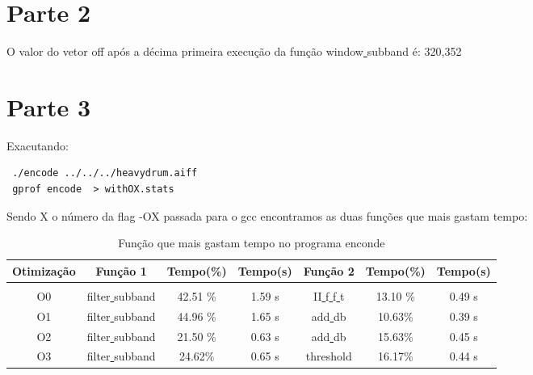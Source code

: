 \documentclass[10pt,a4paper]{article}
\begin{document}








\section{Parte 2}
O valor do vetor off após a décima primeira execução da função
window\underline{ }subband é: {320,352} 

\section{Parte 3}
Exacutando:
\begin{verbatim}
 ./encode ../../../heavydrum.aiff 
 gprof encode  > withOX.stats
\end{verbatim}
Sendo X o número da flag -OX passada para o gcc encontramos as duas
funções que mais gastam tempo:

\begin{table}[h!]
  \caption{Função que mais gastam tempo no programa enconde}
  \begin{tabular}{ccccccc}
    Otimização & Função 1 & Tempo(\%) & Tempo(s) & Função 2  & Tempo(\%) &
    Tempo(s)\\
    \hline\\
    O0 & filter\underline{ }subband &42.51 \% &1.59 s &
    II\underline{ }f\underline{ }f\underline{ }t& 13.10 \%& 0.49 s\\
    O1 & filter\underline{ }subband & 44.96 \%& 1.65 s &
    add\underline{ }db& 10.63\%& 0.39 s\\
    O2 &
    filter\underline{ }subband& 21.50 \%& 0.63 s &
    add\underline{ }db &15.63\% &0.45 s\\
    O3 &
    filter\underline{ }subband &24.62\%& 0.65 s&
    threshold & 16.17\%& 0.44 s


  \end{tabular}
\end{table}
\end{document}
